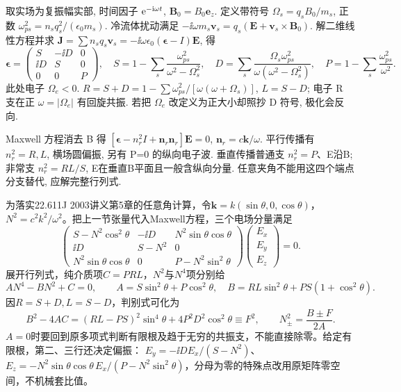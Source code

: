 \label{ch:cold}
取实场为复振幅实部, 时间因子 $\mathrm e^{-\mathrm i\omega t}$, $\mathbf B_0=B_0\mathbf e_z$. 定义带符号 $\Omega_s=q_sB_0/m_s$, 正数 $\omega_{ps}^2=n_sq_s^2/(\epsilon_0m_s)$. 冷流体扰动满足 $-\ii\omega m_s\mathbf v_s=q_s(\mathbf E+\mathbf v_s\times\mathbf B_0)$. 解二维线性方程并求 $\mathbf J=\sum n_sq_s\mathbf v_s=-\ii\omega\epsilon_0(\boldsymbol\epsilon-I)\mathbf E$, 得
\begin{equation}
 \boldsymbol\epsilon=\begin{pmatrix}S&-\ii D&0\\\ii D&S&0\\0&0&P\end{pmatrix},\quad
 S=1-\sum_s\frac{\omega_{ps}^2}{\omega^2-\Omega_s^2},\quad
 D=\sum_s\frac{\Omega_s\omega_{ps}^2}{\omega(\omega^2-\Omega_s^2)},\quad
 P=1-\sum_s\frac{\omega_{ps}^2}{\omega^2}.
\end{equation}
此处电子 $\Omega_e<0$. $R=S+D=1-\sum\omega_{ps}^2/[\omega(\omega+\Omega_s)]$, $L=S-D$; 电子 R 支在正 $\omega=|\Omega_e|$ 有回旋共振. 若把 $\Omega_e$ 改定义为正大小却照抄 D 符号, 极化会反向.

Maxwell 方程消去 B 得 $[\boldsymbol\epsilon-n_r^2I+\mathbf n_r\mathbf n_r]\mathbf E=0$, $\mathbf n_r=c\mathbf k/\omega$. 平行传播有 $n_r^2=R,L$, 横场圆偏振, 另有 P=0 的纵向电子波. 垂直传播普通支 $n_r^2=P$、E沿B; 非常支 $n_r^2=RL/S$, E在垂直B平面且一般含纵向分量. 任意夹角不能用这四个端点分支替代, 应解完整行列式.

为落实22.611J 2003讲义第5章的任意角计算，令$\mathbf k=k(\sin\theta,0,\cos\theta)$，$N^2=c^2k^2/\omega^2$。把上一节张量代入Maxwell方程，三个电场分量满足
\begin{equation}
\begin{pmatrix}
S-N^2\cos^2\theta&-\ii D&N^2\sin\theta\cos\theta\\
\ii D&S-N^2&0\\
N^2\sin\theta\cos\theta&0&P-N^2\sin^2\theta
\end{pmatrix}
\begin{pmatrix}E_x\\E_y\\E_z\end{pmatrix}=0 .
\end{equation}
展开行列式，纯介质项$C=PRL$，$N^2$与$N^4$项分别给
\begin{equation}
A N^4-B N^2+C=0,\qquad
A=S\sin^2\theta+P\cos^2\theta,\quad
B=RL\sin^2\theta+PS(1+\cos^2\theta).
\end{equation}
因$R=S+D,L=S-D$，判别式可化为
\begin{equation}
B^2-4AC=(RL-PS)^2\sin^4\theta+4P^2D^2\cos^2\theta\equiv F^2,
\qquad N_\pm^2=\frac{B\pm F}{2A}.
\end{equation}
$A=0$时要回到原多项式判断有限根及趋于无穷的共振支，不能直接除零。给定有限根，第二、三行还决定偏振：
$E_y=-\ii D E_x/(S-N^2)$、
$E_z=-N^2\sin\theta\cos\theta\,E_x/(P-N^2\sin^2\theta)$，分母为零的特殊点改用原矩阵零空间，不机械套比值。

